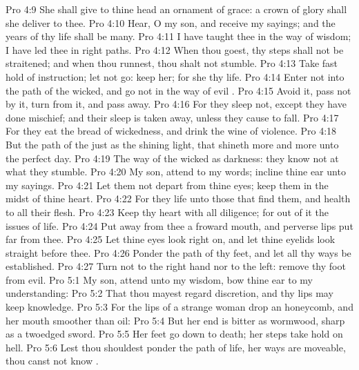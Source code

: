 \vs Pro 4:9 She shall give to thine head an ornament of grace: a crown of glory shall she deliver to thee.
\vs Pro 4:10 Hear, O my son, and receive my sayings; and the years of thy life shall be many.
\vs Pro 4:11 I have taught thee in the way of wisdom; I have led thee in right paths.
\vs Pro 4:12 When thou goest, thy steps shall not be straitened; and when thou runnest, thou shalt not stumble.
\vs Pro 4:13 Take fast hold of instruction; let  not go: keep her; for she  thy life.
\vs Pro 4:14 Enter not into the path of the wicked, and go not in the way of evil .
\vs Pro 4:15 Avoid it, pass not by it, turn from it, and pass away.
\vs Pro 4:16 For they sleep not, except they have done mischief; and their sleep is taken away, unless they cause  to fall.
\vs Pro 4:17 For they eat the bread of wickedness, and drink the wine of violence.
\vs Pro 4:18 But the path of the just  as the shining light, that shineth more and more unto the perfect day.
\vs Pro 4:19 The way of the wicked  as darkness: they know not at what they stumble.
\vs Pro 4:20 My son, attend to my words; incline thine ear unto my sayings.
\vs Pro 4:21 Let them not depart from thine eyes; keep them in the midst of thine heart.
\vs Pro 4:22 For they  life unto those that find them, and health to all their flesh.
\vs Pro 4:23 Keep thy heart with all diligence; for out of it  the issues of life.
\vs Pro 4:24 Put away from thee a froward mouth, and perverse lips put far from thee.
\vs Pro 4:25 Let thine eyes look right on, and let thine eyelids look straight before thee.
\vs Pro 4:26 Ponder the path of thy feet, and let all thy ways be established.
\vs Pro 4:27 Turn not to the right hand nor to the left: remove thy foot from evil.
\vs Pro 5:1 My son, attend unto my wisdom,  bow thine ear to my understanding:
\vs Pro 5:2 That thou mayest regard discretion, and  thy lips may keep knowledge.
\vs Pro 5:3 For the lips of a strange woman drop  an honeycomb, and her mouth  smoother than oil:
\vs Pro 5:4 But her end is bitter as wormwood, sharp as a twoedged sword.
\vs Pro 5:5 Her feet go down to death; her steps take hold on hell.
\vs Pro 5:6 Lest thou shouldest ponder the path of life, her ways are moveable,  thou canst not know .
